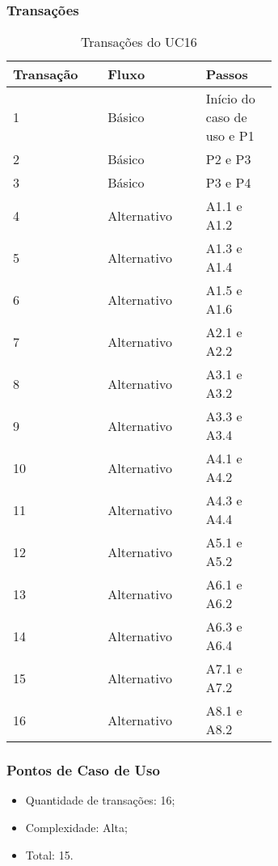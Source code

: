   \subsubsection{Transações}

  \begin{table*}[!h]
  \centering
  \caption{Transações do UC16}
  \label{uc16_transactions}
    \begin{tabular}{|p{0.20\linewidth}|p{0.25\linewidth}|p{0.20\linewidth}|}
    \hline
    \textbf{Transação} & \textbf{Fluxo} & \textbf{Passos} \\ 
    \hline
    1 & Básico & Início do caso de uso e P1\\
    \hline
    2 & Básico & P2 e P3\\
    \hline
    3 & Básico & P3 e P4\\
    \hline
    4 & Alternativo & A1.1 e A1.2\\
    \hline
    5 & Alternativo & A1.3 e A1.4\\
    \hline
    6 & Alternativo & A1.5 e A1.6\\
    \hline
    7 & Alternativo & A2.1 e A2.2\\
    \hline
    8 & Alternativo & A3.1 e A3.2\\
    \hline
    9 & Alternativo & A3.3 e A3.4\\
    \hline
    10 & Alternativo & A4.1 e A4.2\\
    \hline
    11 & Alternativo & A4.3 e A4.4\\
    \hline
    12 & Alternativo & A5.1 e A5.2\\
    \hline
    13 & Alternativo & A6.1 e A6.2\\
    \hline
    14 & Alternativo & A6.3 e A6.4\\
    \hline
    15 & Alternativo & A7.1 e A7.2\\
    \hline
    16 & Alternativo & A8.1 e A8.2\\
    \hline
    \end{tabular}
  \end{table*}

  \subsubsection{Pontos de Caso de Uso}

  \begin{itemize}
  \item Quantidade de transações: 16;
  \item Complexidade: Alta;
  \item Total: 15.
  \end{itemize}

